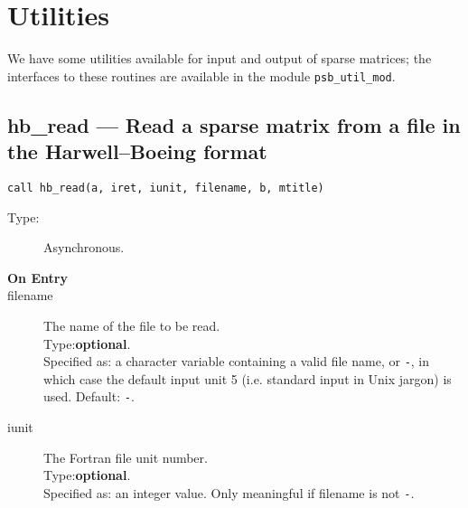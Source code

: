\section{Utilities}
\label{sec:util}

We have some utilities available for input and output of
sparse matrices; the interfaces to these routines are available in the
module \verb|psb_util_mod|.




\clearpage\subsection*{ hb\_read --- Read a sparse matrix from a file in the
  Harwell--Boeing format}


\begin{lstlisting}
call hb_read(a, iret, iunit, filename, b, mtitle)
\end{lstlisting}

\begin{description}
\item[Type:] Asynchronous.
\item[\bf  On Entry ]
\item[filename] The name of the file to be read.\\
Type:{\bf optional}.\\
Specified as: a character variable containing a valid file name, or
\verb|-|, in which case the default input unit  5 (i.e. standard input
in Unix jargon) is used. Default: \verb|-|. 
\item[iunit] The Fortran file unit number.\\
Type:{\bf optional}.\\
Specified as: an integer value. Only meaningful if filename is not \verb|-|.
\end{description}

